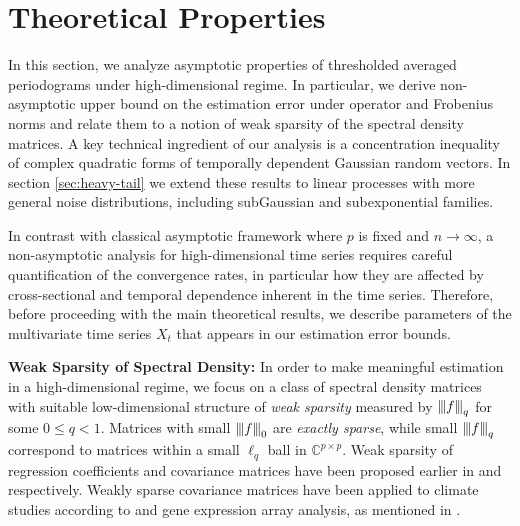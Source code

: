 \section{Theoretical Properties}\label{sec:theory}
In this section, we analyze asymptotic properties of thresholded averaged periodograms under high-dimensional regime. In particular, we derive non-asymptotic upper bound on the estimation error under operator and Frobenius norms and relate them to a notion of weak sparsity of the spectral density matrices. A key technical ingredient of our analysis is a concentration inequality of complex quadratic forms of temporally dependent Gaussian random vectors. In section \ref{sec:heavy-tail} we extend these results to linear processes with more general noise distributions, including subGaussian and   subexponential families.

In contrast with classical asymptotic framework where $p$ is fixed and $n \rightarrow \infty$, a non-asymptotic analysis for high-dimensional time series requires careful quantification of the convergence rates, in particular how they are affected by cross-sectional and temporal dependence inherent in the time series. Therefore, before proceeding with the main theoretical results, we describe parameters of the multivariate time series $X_t$ that appears in our estimation error bounds.

\smallskip
\noindent \textbf{Weak Sparsity of Spectral Density: } 
In order to make meaningful estimation in a high-dimensional regime, we focus on a class of spectral density matrices with suitable low-dimensional structure of \textit{weak sparsity} measured by ${\left\vert\kern-0.25ex\left\vert\kern-0.25ex\left\vert f \right\vert\kern-0.25ex\right\vert\kern-0.25ex\right\vert}_q$ for some $0 \le q < 1$. Matrices with small ${\left\vert\kern-0.25ex\left\vert\kern-0.25ex\left\vert f \right\vert\kern-0.25ex\right\vert\kern-0.25ex\right\vert}_0$  are \textit{exactly sparse}, while small  ${\left\vert\kern-0.25ex\left\vert\kern-0.25ex\left\vert f \right\vert\kern-0.25ex\right\vert\kern-0.25ex\right\vert}_q$ correspond to matrices within a small $\ell_q$ ball in $\mathbb{C}^{p\times p}$. Weak sparsity of regression coefficients and covariance matrices have been proposed earlier in \cite{van2016lecture} and \citet{bickel2008covariance} respectively. 
Weakly sparse covariance matrices have been applied to climate studies according to \cite{cai2016rates} and gene expression array analysis, as mentioned in \cite{cai2012minimax}. \par 

